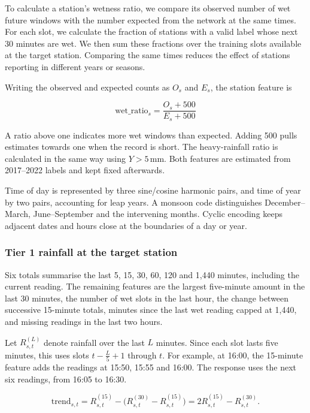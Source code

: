 \documentclass[11pt,a4paper]{article}
\begin{document}
To calculate a station's wetness ratio, we compare its observed number of wet future windows with the number expected from the network at the same times. For each slot, we calculate the fraction of stations with a valid label whose next 30 minutes are wet. We then sum these fractions over the training slots available at the target station. Comparing the same times reduces the effect of stations reporting in different years or seasons. 


Writing the observed and expected counts as \(O_s\) and \(E_s\), the station feature is


\[
\mathrm{wet\_ratio}_s=\frac{O_s+500}{E_s+500}
\]


A ratio above one indicates more wet windows than expected. Adding 500 pulls estimates towards one when the record is short. The heavy-rainfall ratio is calculated in the same way using \(Y>5\,\mathrm{mm}\). Both features are estimated from 2017–2022 labels and kept fixed afterwards. 


Time of day is represented by three sine/cosine harmonic pairs, and time of year by two pairs, accounting for leap years. A monsoon code distinguishes December–March, June–September and the intervening months. Cyclic encoding keeps adjacent dates and hours close at the boundaries of a day or year. 


\subsubsection*{Tier 1 rainfall at the target station}
{}


Six totals summarise the last 5, 15, 30, 60, 120 and 1,440 minutes, including the current reading. The remaining features are the largest five-minute amount in the last 30 minutes, the number of wet slots in the last hour, the change between successive 15-minute totals, minutes since the last wet reading capped at 1,440, and missing readings in the last two hours. 


Let \(R_{s,t}^{(L)}\) denote rainfall over the last \(L\) minutes. Since each slot lasts five minutes, this uses slots \(t-\frac{L}{5}+1\) through \(t\). For example, at 16:00, the 15-minute feature adds the readings at 15:50, 15:55 and 16:00. The response uses the next six readings, from 16:05 to 16:30.


\[
\mathrm{trend}_{s,t}=R_{s,t}^{(15)}-\bigl(R_{s,t}^{(30)}-R_{s,t}^{(15)}\bigr)=2R_{s,t}^{(15)}-R_{s,t}^{(30)}.
\]
\end{document}
